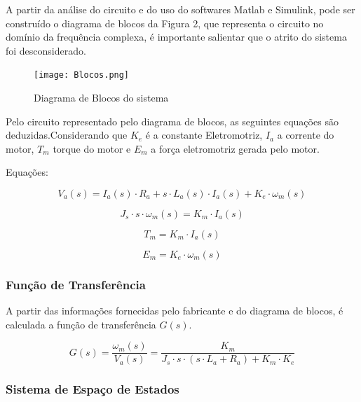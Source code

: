 \documentclass[12pt]{article}
\begin{document}
\quad A partir da análise do circuito e do uso do softwares Matlab e Simulink, pode ser construído o diagrama de blocos da Figura 2, que representa o circuito no domínio da frequência complexa, é importante salientar que o atrito do sistema foi desconsiderado.

\begin{figure}[H] 
    \centering
    \texttt{[image: Blocos.png]}
    \caption{Diagrama de Blocos do sistema}
    \label{fig:mesh2}
\end{figure}

\quad Pelo circuito representado pelo diagrama de blocos, as seguintes equações são deduzidas.Considerando que $K_e$ é a constante Eletromotriz, $I_a$ a corrente do motor, $T_m$ torque do motor e $E_m$ a força eletromotriz gerada pelo motor.
\\\par Equações:

\begin{equation}
    V_a (s) = I_a(s) \cdot R_a + s\cdot L_a(s)\cdot I_a (s) + K_e\cdot \omega_m (s)
\end{equation}

\begin{equation}
    J_s\cdot s \cdot \omega_m (s) = K_m \cdot I_a (s)
\end{equation}

\begin{equation}
    T_m = K_m \cdot I_a (s)
\end{equation}

\begin{equation}
    E_m = K_e \cdot \omega_m (s)
\end{equation}

\subsubsection{Função de Transferência}
\quad A partir das informações fornecidas pelo fabricante e do diagrama de blocos, é calculada a função de transferência $G(s)$.

\begin{equation}
    G(s) = \frac{\omega_m (s)}{V_a (s)} = \frac{K_m}{J_s \cdot s \cdot (s \cdot L_a + R_a) + K_m \cdot K_e}
\end{equation}

\subsubsection{Sistema de Espaço de Estados}
\end{document}
